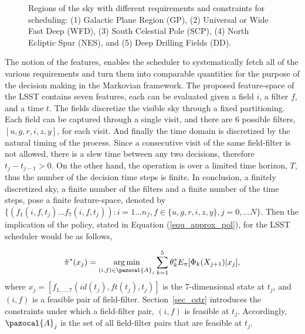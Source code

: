 \documentclass[12pt]{aastex62}
\theoremstyle{definition}
\DeclareMathOperator*{\argmin}{arg\,min}
\begin{document}
\begin{figure}[h!]
\begin{center}
\caption{Regions of the sky with different requirements and constraints for scheduling: (1) Galactic Plane Region (GP), (2) Universal or Wide Fast Deep (WFD), (3) South Celestial Pole (SCP), (4) North Ecliptic Spur (NES), and (5) Deep Drilling Fields (DD).}
\end{center}
\end{figure}\label{fig_proposals}

 The notion of the features, enables the scheduler to systematically fetch all of the various requirements and turn them into comparable quantities for the purpose of the decision making in the Markovian framework. The proposed feature-space of the LSST contains seven features, each can be evaluated given a field $i$, a filter $f$, and a time $t$. The fields discretize the visible sky through a fixed partitioning. Each field can be captured through a single visit, and there are 6 possible filters, $[u,g,r,i,z,y]$, for each visit. And finally the time domain is discretized by the natural timing of the process. Since a consecutive visit of the same field-filter is not allowed, there is a slew time between any two decisions, therefore $t_{j} - t_{j-1} > 0$. On the other hand, the operation is over a limited time horizon, $T$, thus the number of the decision time steps is finite. In conclusion, a finitely discretized sky, a finite number of the filters and a finite number of the time steps, pose a finite feature-space, denoted by $\{(f_1(i,f,t_j)\dots f_7(i,f,t_j)): i = 1\dots n_f, f\in \{u,g,r,i,z,y\}, j = 0,\dots N\}$. Then the implication of the policy, stated in Equation (\ref{equ_approx_pol}), for the LSST scheduler would be as follows,

\begin{equation}\label{equ_approx_pol_imp}
\tilde{\pi}^*(x_j)= \argmin_{(i,f)\in \pazocal{A}_{j}} \sum_{k=1}^5 \theta^*_k E_{\pi}[\Phi_k(X_{j+1}) | x_j]\\,
\end{equation}
where $x_j = [f_{1, \dots,7}(id(t_j),ft(t_j),t_j)]$ is the 7-dimensional state at $t_j$, and $(i,f)$ is a feasible pair of field-filter. Section~\ref{sec_cstr} introduces the constraints under which a field-filter pair, $(i,f)$ is feasible at $t_{j}$. Accordingly, $\pazocal{A}_j$ is  the set of all field-filter pairs that are feasible at $t_j$.
\end{document}
